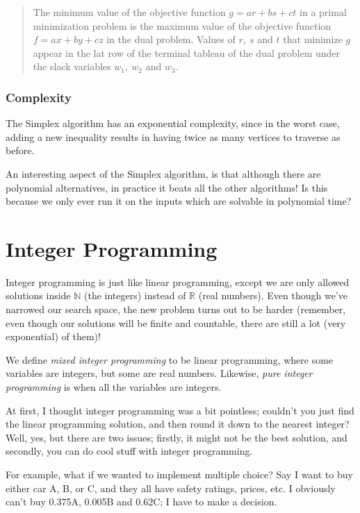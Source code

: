 \begin{quote}
  The minimum value of the objective function $g = ar + bs + ct$ in a primal
  minimization problem is the maximum value of the objective function $f = ax +
  by + cz$ in the dual problem. Values of $r,~s$ and $t$ that minimize $g$
  appear in the lat row of the terminal tableau of the dual problem under the
  slack variables $w_1,~w_2$ and $w_3$.
\end{quote}

\subsubsection{Complexity}

The Simplex algorithm has an exponential complexity, since in the worst case,
adding a new inequality results in having twice as many vertices to traverse as
before.

An interesting aspect of the Simplex algorithm, is that although there are
polynomial alternatives, in practice it beats all the other algorithms! Is this
because we only ever run it on the inputs which are solvable in polynomial time?

\section{Integer Programming}
\label{sec:ip}

Integer programming is just like linear programming, except we are only allowed
solutions inside $\mathbb{N}$ (the integers) instead of $\mathbb{R}$ (real
numbers). Even though we've narrowed our search space, the new problem turns out
to be harder (remember, even though our solutions will be finite and countable,
there are still a lot (very exponential) of them)!

We define \textit{mixed integer programming} to be linear programming, where
some variables are integers, but some are real numbers. Likewise, \textit{pure
integer programming} is when all the variables are integers.

At first, I thought integer programming was a bit pointless; couldn't you just
find the linear programming solution, and then round it down to the nearest
integer? Well, yes, but there are two issues; firstly, it might not be the best
solution, and secondly, you can do cool stuff with integer programming.

For example, what if we wanted to implement multiple choice? Say I want to buy
either car A, B, or C, and they all have safety ratings, prices, etc. I
obviously can't buy 0.375A, 0.005B and 0.62C; I have to make a decision.


